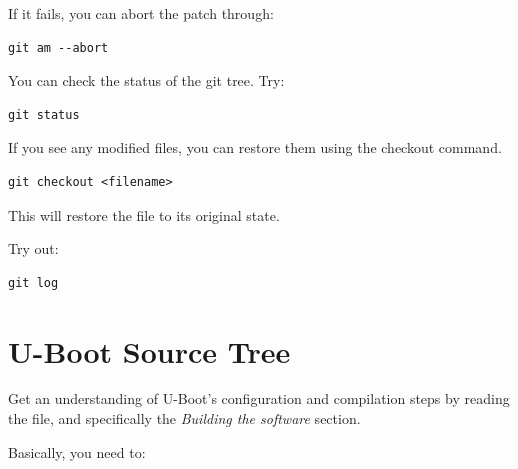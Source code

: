 If it fails, you can abort the patch through:
{\small
\begin{verbatim}
git am --abort
\end{verbatim}
}

You can check the status of the git tree. Try:
{\small
\begin{verbatim}
git status
\end{verbatim}
}

If you see any modified files, you can restore them using the checkout command.

{\small
\begin{verbatim}
git checkout <filename>
\end{verbatim}
}

This will restore the file to its original state.

Try out:
{\small
\begin{verbatim}
git log
\end{verbatim}
}

\clearpage
\section{U-Boot Source Tree}
Get an understanding of U-Boot's configuration and compilation steps by
reading the  file, and specifically the {\em Building the
  software} section.

Basically, you need to:

